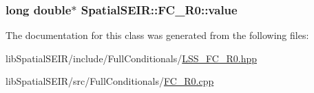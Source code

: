 \hypertarget{classSpatialSEIR_1_1FC__R0_a9ef45e653aff78f2fc3e589d1efbfdf2}{
\subsubsection[{value}]{\setlength{\rightskip}{0pt plus 5cm}long double$\ast$ Spatial\-S\-E\-I\-R\-::\-F\-C\-\_\-\-R0\-::value}}\label{classSpatialSEIR_1_1FC__R0_a9ef45e653aff78f2fc3e589d1efbfdf2}


The documentation for this class was generated from the following files\-:\begin{DoxyCompactItemize}
\item 
lib\-Spatial\-S\-E\-I\-R/include/\-Full\-Conditionals/\hyperlink{LSS__FC__R0_8hpp}{L\-S\-S\-\_\-\-F\-C\-\_\-\-R0.\-hpp}\item 
lib\-Spatial\-S\-E\-I\-R/src/\-Full\-Conditionals/\hyperlink{FC__R0_8cpp}{F\-C\-\_\-\-R0.\-cpp}\end{DoxyCompactItemize}
